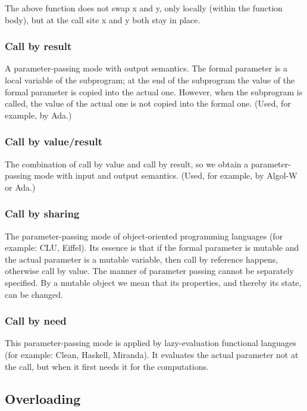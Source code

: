 \documentclass[margin=0px]{article}
\begin{document}
The above function does not swap x and y, only locally (within the function body), but at the call site
x and y both stay in place.

\subsubsection{Call by result}

A parameter-passing mode with output semantics. The formal parameter is a local variable of the subprogram; at the end of the subprogram the value of the formal parameter is copied into the actual one. However, when the subprogram is called, the value of the actual one is not copied into the formal one. (Used, for example, by Ada.)

\subsubsection{Call by value/result}

The combination of call by value and call by result, so we obtain a parameter-passing mode with input and output semantics. (Used, for example, by Algol-W or Ada.)

\subsubsection{Call by sharing}

The parameter-passing mode of object-oriented programming languages (for example: CLU, Eiffel). Its essence is that if the formal parameter is mutable and the actual parameter is a mutable variable, then call by reference happens, otherwise call by value. The manner of parameter passing cannot be separately specified.
By a mutable object we mean that its properties, and thereby its state, can be changed.

\subsubsection{Call by need}

This parameter-passing mode is applied by lazy-evaluation functional languages (for example: Clean, Haskell, Miranda). It evaluates the actual parameter not at the call, but when it first needs it for the computations.

\subsection{Overloading}
\end{document}
